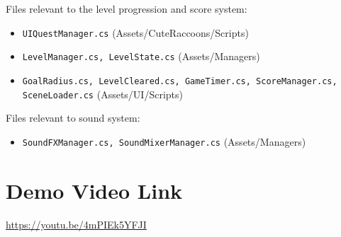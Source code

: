 \documentclass[10pt]{final_report}
\begin{document}
Files relevant to the level progression and score system:
\begin{itemize}
    \item \texttt{UIQuestManager.cs} (Assets/CuteRaccoons/Scripts)
    \item \texttt{LevelManager.cs, LevelState.cs} (Assets/Managers)
    \item \texttt{GoalRadius.cs, LevelCleared.cs, GameTimer.cs, ScoreManager.cs, SceneLoader.cs} (Assets/UI/Scripts)
\end{itemize}

Files relevant to sound system:
\begin{itemize}
    \item \texttt{SoundFXManager.cs, SoundMixerManager.cs} (Assets/Managers)
\end{itemize}

\section{Demo Video Link}
\url{https://youtu.be/4mPIEk5YFJI}

\newpage
{}
{}

\raggedright

\end{document}
